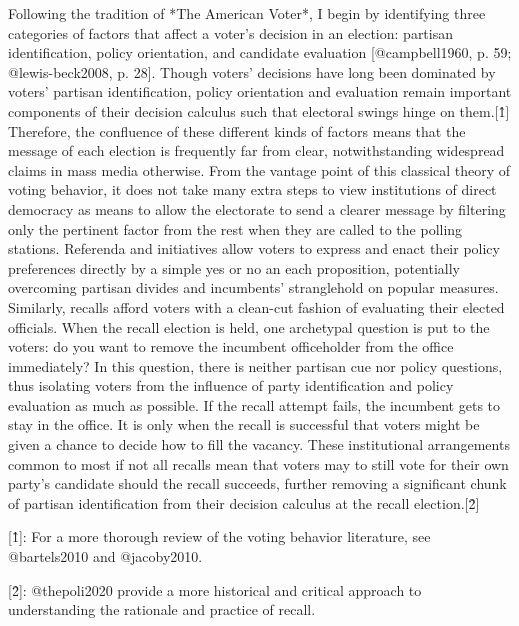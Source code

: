 \documentclass[hyphens, crop=false]{standalone}
\begin{document}
	
	Following the tradition of *The American Voter*,
	I begin by identifying three categories of factors that affect a voter's decision in an election:
	partisan identification, policy orientation, and candidate evaluation [@campbell1960, p. 59; @lewis-beck2008, p. 28].
	Though voters' decisions have long been dominated by voters' partisan identification,
	policy orientation and evaluation remain important components of their decision calculus such that electoral swings hinge on them.[\^1]
	Therefore,
	the confluence of these different kinds of factors means that the message of each election is frequently far from clear, notwithstanding widespread claims in mass media otherwise.
	From the vantage point of this classical theory of voting behavior,
	it does not take many extra steps to view institutions of direct democracy as means to allow the electorate to send a clearer message
	by filtering only the pertinent factor from the rest when they are called to the polling stations.
	Referenda and initiatives allow voters to express and enact their policy preferences directly by a simple yes or no an each proposition,
	potentially overcoming partisan divides and incumbents' stranglehold on popular measures.
	Similarly,
	recalls afford voters with a clean-cut fashion of evaluating their elected officials.
	When the recall election is held, one archetypal question is put to the voters:
	do you want to remove the incumbent officeholder from the office immediately?
	In this question,
	there is neither partisan cue nor policy questions,
	thus isolating voters from the influence of party identification and policy evaluation as much as possible.
	If the recall attempt fails, the incumbent gets to stay in the office.
	It is only when the recall is successful that voters might be given a chance to decide how to fill the vacancy.
	These institutional arrangements common to most if not all recalls mean that voters may to still vote for their own party's candidate should the recall succeeds,
	further removing a significant chunk of partisan identification from their decision calculus at the recall election.[\^2]
	
	[\^1]: For a more thorough review of the voting behavior literature, see @bartels2010 and @jacoby2010.
	
	[\^2]: @thepoli2020 provide a more historical and critical approach to understanding the rationale and practice of recall.
	
\end{document}
